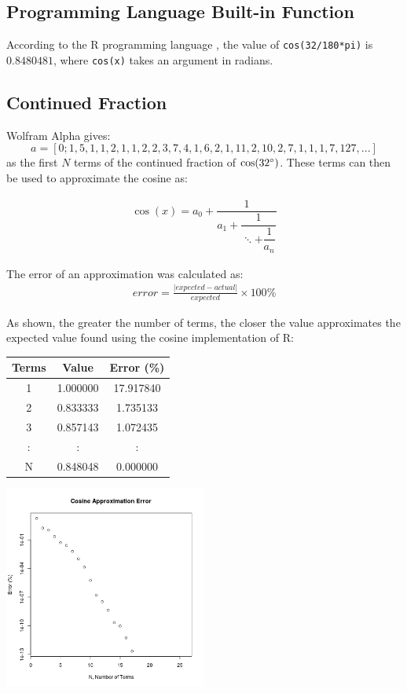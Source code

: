 \documentclass[12pt]{article}
\begin{document}
    \subsection{Programming Language Built-in Function}
      According to the R programming language \cite{R2015}, the value of
      {\tt{cos(32/180*pi)}} is \(0.8480481\), where {\tt{cos(x)}} takes an
      argument in radians.

    \subsection{Continued Fraction}
      Wolfram Alpha \cite{wolframalpha2015} gives:
      $$
      a = [0; 1, 5, 1, 1, 2, 1, 1, 2, 2, 3, 7, 4, 1, 6, 2, 1, 11, 2, 10, 2, 7,
        1, 1, 1, 7, 127, ...]
      $$
      as the first \(N\) terms of the continued fraction of \(\cos(32
      \degree)\). These terms can then be used to approximate the cosine as:

      \begin{align}
        \cos(x) = a_0 + \dfrac{1}{a_1 + \dfrac{1}{\ddots + \dfrac{1}{a_n}}}
      \end{align}

      The error of an approximation was calculated as:
      \begin{align}
        error = \frac{|expected - actual|}{expected} \times 100\%
      \end{align}

      As shown, the greater the number of terms, the closer the value
      approximates the expected value found using the cosine implementation of
      R:
      \begin{center}
        \begin{tabular}{|c||c|c|}
          \hline
          Terms & Value & Error (\%) \\
          \hline
          1 & 1.000000 & 17.917840 \\
          2 & 0.833333 & 1.735133 \\
          3 & 0.857143 & 1.072435 \\
          : & : & : \\
          N & 0.848048 & 0.000000 \\
          \hline
        \end{tabular}
      \end{center}
      \begin{center}
        \includegraphics[width=0.5\textwidth]{writing/error}
      \end{center}
\end{document}
